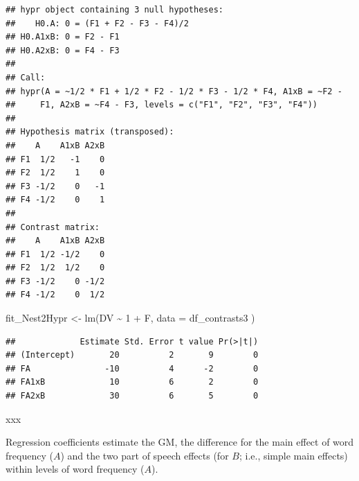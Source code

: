 \documentclass[
  12pt,
]{krantz}
\newenvironment{Shaded}{\begin{snugshade}}{\end{snugshade}}
\newcommand{\AttributeTok}[1]{\textcolor[rgb]{0.77,0.63,0.00}{#1}}
\newcommand{\DecValTok}[1]{\textcolor[rgb]{0.00,0.00,0.81}{#1}}
\newcommand{\FunctionTok}[1]{\textcolor[rgb]{0.00,0.00,0.00}{#1}}
\newcommand{\NormalTok}[1]{#1}
\newcommand{\OtherTok}[1]{\textcolor[rgb]{0.56,0.35,0.01}{#1}}
\newcommand{\SpecialCharTok}[1]{\textcolor[rgb]{0.00,0.00,0.00}{#1}}
\theoremstyle{definition}
\theoremstyle{definition}
\theoremstyle{definition}
\theoremstyle{definition}
\theoremstyle{remark}
\begin{document}
\begin{verbatim}
## hypr object containing 3 null hypotheses:
##    H0.A: 0 = (F1 + F2 - F3 - F4)/2
## H0.A1xB: 0 = F2 - F1
## H0.A2xB: 0 = F4 - F3
## 
## Call:
## hypr(A = ~1/2 * F1 + 1/2 * F2 - 1/2 * F3 - 1/2 * F4, A1xB = ~F2 - 
##     F1, A2xB = ~F4 - F3, levels = c("F1", "F2", "F3", "F4"))
## 
## Hypothesis matrix (transposed):
##    A    A1xB A2xB
## F1  1/2   -1    0
## F2  1/2    1    0
## F3 -1/2    0   -1
## F4 -1/2    0    1
## 
## Contrast matrix:
##    A    A1xB A2xB
## F1  1/2 -1/2    0
## F2  1/2  1/2    0
## F3 -1/2    0 -1/2
## F4 -1/2    0  1/2
\end{verbatim}

\begin{Shaded}
\end{Shaded}

\begin{Shaded}
\begin{Highlighting}[]
\NormalTok{fit\_Nest2Hypr }\OtherTok{\textless{}{-}} \FunctionTok{lm}\NormalTok{(DV }\SpecialCharTok{\textasciitilde{}} \DecValTok{1} \SpecialCharTok{+}\NormalTok{ F,}
  \AttributeTok{data =}\NormalTok{ df\_contrasts3}
\NormalTok{)}
\end{Highlighting}
\end{Shaded}

\begin{Shaded}
\end{Shaded}

\begin{verbatim}
##             Estimate Std. Error t value Pr(>|t|)
## (Intercept)       20          2       9        0
## FA               -10          4      -2        0
## FA1xB             10          6       2        0
## FA2xB             30          6       5        0
\end{verbatim}

xxx

Regression coefficients estimate the GM, the difference for the main effect of word frequency (\(A\)) and the two part of speech effects (for \(B\); i.e., simple main effects) within levels of word frequency (\(A\)).
\end{document}

